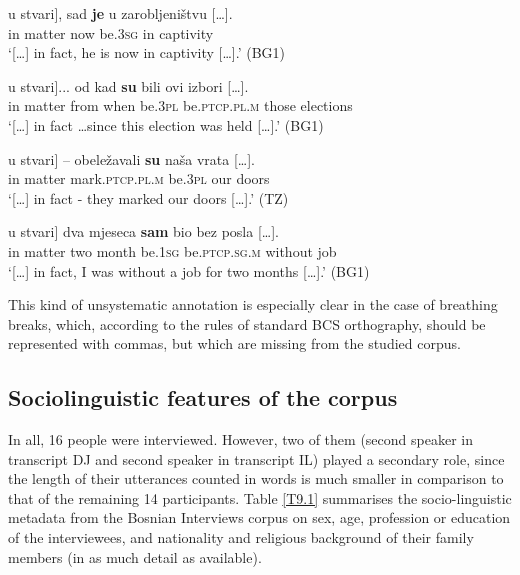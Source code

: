 \begin{exe}\ex\label{(9.X1)} 
\gll [\dots] \minsp{[} u stvari], sad \textbf{je} u {zarobljeništvu  [\dots].} \\
{} {} in matter now be.\textsc{3sg} in captivity \\
\glt ‘[\dots] in fact, he is now in captivity [\dots].’
\hfill (BG1) 

\ex\label{(9.X3)} 
\gll [\dots] \minsp{[} u stvari]... od kad \textbf{su} bili ovi {izbori  [\dots].} \\
{} {} in matter from when be.\textsc{3pl} be.\textsc{ptcp.pl.m} those elections \\
\glt ‘[\dots] in fact \dots since this election was held [\dots].’
\hfill (BG1) 

\ex\label{(9.X4)} 
\gll [\dots] \minsp{[} u stvari] -- obeležavali \textbf{su} naša {vrata  [\dots].} \\
{} {} in matter {} mark.\textsc{ptcp.pl.m} be.\textsc{3pl} our doors \\
\glt ‘[\dots] in fact - they marked our doors [\dots].’
\hfill  (TZ)

\ex\label{(9.X2)} 
\gll [\dots] \minsp{[} u stvari] dva mjeseca \textbf{sam} bio bez {posla [\dots].} \\ 
{} {} in matter two month be.\textsc{1sg} be.\textsc{ptcp.sg.m} without job \\
\glt ‘[\dots]  in fact, I was without a job for two months [\dots].’
\hfill (BG1) 
\end{exe}


\noindent This kind of unsystematic annotation is especially clear in the case of breathing breaks, which, according to the rules of standard BCS orthography, should be represented with commas, but which are missing from the studied corpus.

\subsection{Sociolinguistic features of the corpus}
\label{Sociolinguistic paramters of the corpus}
In all, 16 people were interviewed. However, two of them (second speaker in transcript DJ and second speaker in transcript IL) played a secondary role, since the length of their utterances counted in words is much smaller in comparison to that of the remaining 14 participants. Table \ref{T9.1} summarises the socio-linguistic metadata from the Bosnian Interviews corpus on sex, age, profession or education of the interviewees, and nationality and religious background of their family members (in as much detail as available).

